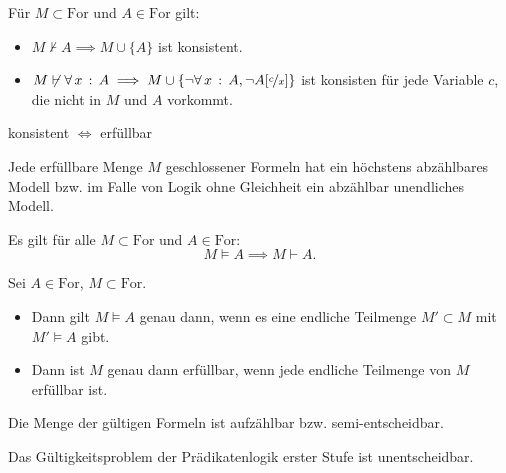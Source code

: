 \documentclass{cheat-sheet}
\newcommand{\For}{\mathrm{For}} %
\newcommand{\subst}[2]{\nicefrac{#1}{#2}} %
\begin{document}
\begin{lem}
  Für $M \subset \For$ und $A \in \For$ gilt:
  \begin{itemize}
    \item $M \not\vdash A \implies M \cup \{ A \}$ ist konsistent.
    \item $M \not\vdash \fa{x} A \implies M \cup \{ \neg \fa{x} A, \neg A[\subst{c}{x}] \}$ ist konsisten für jede Variable $c$, die nicht in $M$ und $A$ vorkommt.
  \end{itemize}
\end{lem}

\begin{lem}
  konsistent $\iff$ erfüllbar
\end{lem}

\begin{satz}
  Jede erfüllbare Menge $M$ geschlossener Formeln hat ein höchstens abzählbares Modell bzw. im Falle von Logik ohne Gleichheit ein abzählbar unendliches Modell.
\end{satz}

\begin{satz}[Vollständigkeit]
  Es gilt für alle $M \subset \For$ und $A \in \For$:
  \[ M \models A \implies M \vdash A. \]
\end{satz}

\begin{satz}
  Sei $A \in \For$, $M \subset \For$.
  \begin{itemize}
    \item Dann gilt $M \models A$ genau dann, wenn es eine endliche Teilmenge $M' \subset M$ mit $M' \models A$ gibt.
    \item Dann ist $M$ genau dann erfüllbar, wenn jede endliche Teilmenge von $M$ erfüllbar ist.
  \end{itemize}
\end{satz}

\begin{bem}
  Die Menge der gültigen Formeln ist aufzählbar bzw. semi-entscheidbar.
\end{bem}

\begin{satz}[Church]
  Das Gültigkeitsproblem der Prädikatenlogik erster Stufe ist unentscheidbar.
\end{satz}
\end{document}
